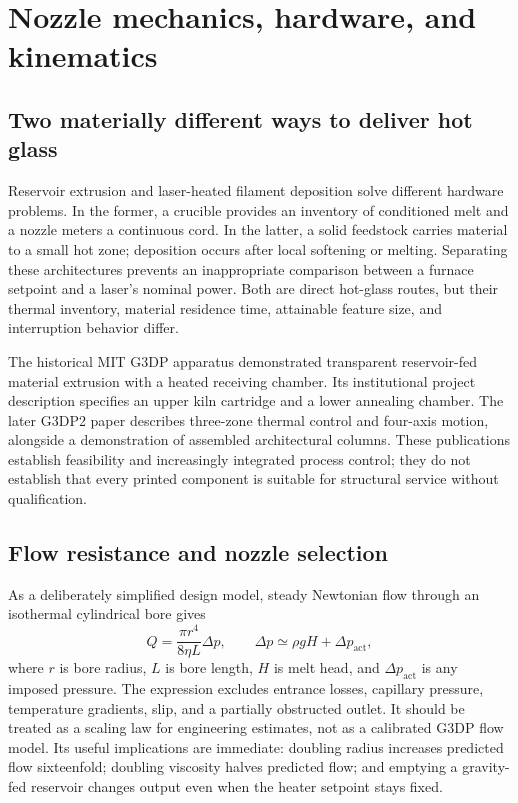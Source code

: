 \section{Nozzle mechanics, hardware, and kinematics}
\label{sec:hardware}
\subsection{Two materially different ways to deliver hot glass}
Reservoir extrusion and laser-heated filament deposition solve different hardware problems. In the former, a crucible provides an inventory of conditioned melt and a nozzle meters a continuous cord. In the latter, a solid feedstock carries material to a small hot zone; deposition occurs after local softening or melting. Separating these architectures prevents an inappropriate comparison between a furnace setpoint and a laser's nominal power. Both are direct hot-glass routes, but their thermal inventory, material residence time, attainable feature size, and interruption behavior differ.

The historical MIT G3DP apparatus demonstrated transparent reservoir-fed material extrusion with a heated receiving chamber. Its institutional project description specifies an upper kiln cartridge and a lower annealing chamber. The later G3DP2 paper describes three-zone thermal control and four-axis motion, alongside a demonstration of assembled architectural columns. These publications establish feasibility and increasingly integrated process control; they do not establish that every printed component is suitable for structural service without qualification.\cite{acad_klein2015,acad_mitproject,acad_inamura2018}

\subsection{Flow resistance and nozzle selection}
As a deliberately simplified design model, steady Newtonian flow through an isothermal cylindrical bore gives
\begin{equation}
 Q=\frac{\pi r^4}{8\eta L}\Delta p,\qquad
 \Delta p\simeq \rho g H+\Delta p_{\mathrm{act}},
 \label{eq:nozzleflow}
\end{equation}
where $r$ is bore radius, $L$ is bore length, $H$ is melt head, and $\Delta p_{\mathrm{act}}$ is any imposed pressure. The expression excludes entrance losses, capillary pressure, temperature gradients, slip, and a partially obstructed outlet. It should be treated as a scaling law for engineering estimates, not as a calibrated G3DP flow model. Its useful implications are immediate: doubling radius increases predicted flow sixteenfold; doubling viscosity halves predicted flow; and emptying a gravity-fed reservoir changes output even when the heater setpoint stays fixed.

